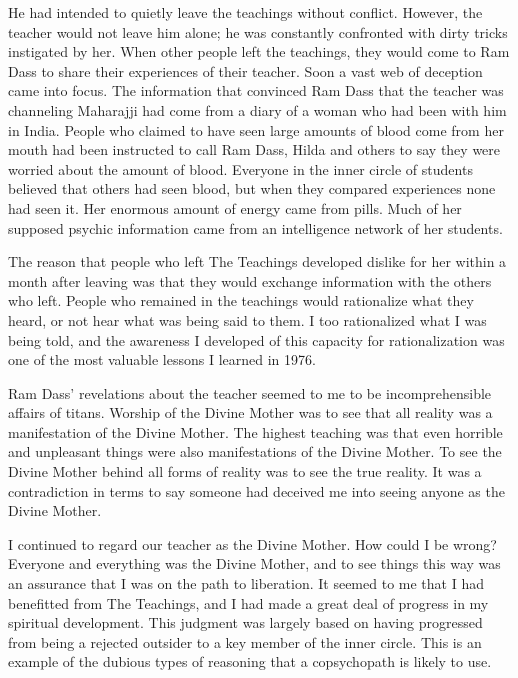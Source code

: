 \documentclass[a5paper,10pt,english]{book}
\begin{document}
\sphinxAtStartPar
He had intended to quietly leave the teachings without conflict.
However, the teacher would not leave him alone; he was constantly
confronted with dirty tricks instigated by her. When other people left
the teachings, they would come to Ram Dass to share their experiences of
their teacher. Soon a vast web of deception came into focus. The
information that convinced Ram Dass that the teacher was channeling
Maharajji had come from a diary of a woman who had been with him in
India. People who claimed to have seen large amounts of blood come from
her mouth had been instructed to call Ram Dass, Hilda and others to say
they were worried about the amount of blood. Everyone in the inner
circle of students believed that others had seen blood, but when they
compared experiences none had seen it. Her enormous amount of energy
came from pills. Much of her supposed psychic information came from an
intelligence network of her students.

\sphinxAtStartPar
The reason that people who left The Teachings developed dislike for her
within a month after leaving was that they would exchange information
with the others who left. People who remained in the teachings would
rationalize what they heard, or not hear what was being said to them. I
too rationalized what I was being told, and the awareness I developed of
this capacity for rationalization was one of the most valuable lessons I
learned in 1976.

\sphinxAtStartPar
Ram Dass’ revelations about the teacher seemed to me to be
incomprehensible affairs of titans. Worship of the Divine Mother was to
see that all reality was a manifestation of the Divine Mother. The
highest teaching was that even horrible and unpleasant things were also
manifestations of the Divine Mother. To see the Divine Mother behind all
forms of reality was to see the true reality. It was a contradiction in
terms to say someone had deceived me into seeing anyone as the Divine
Mother.

\sphinxAtStartPar
I continued to regard our teacher as the Divine Mother. How could I be
wrong? Everyone and everything was the Divine Mother, and to see things
this way was an assurance that I was on the path to liberation. It
seemed to me that I had benefitted from The Teachings, and I had made a
great deal of progress in my spiritual development. This judgment was
largely based on having progressed from being a rejected outsider to a
key member of the inner circle. This is an example of the dubious types
of reasoning that a co\sphinxhyphen{}psychopath is likely to use.
\end{document}
